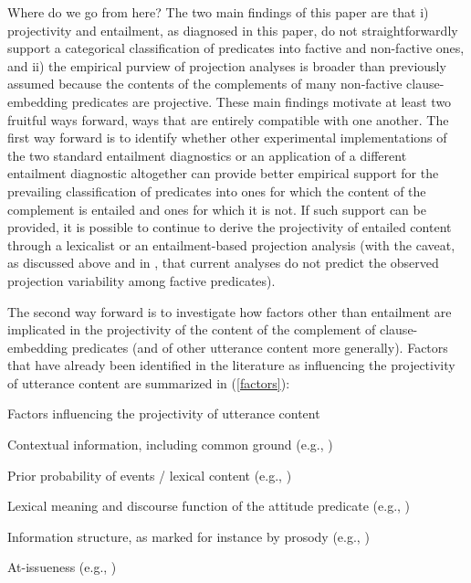 \documentclass[11pt,fleqn]{article}
\newcommand{\6}{\mbox{$[\hspace*{-.6mm}[$}}
\newcommand{\9}{\mbox{$]\hspace*{-.6mm}]$}}
\begin{document}
{Where do we go from here? The two main findings of this paper are that i) projectivity and entailment, as diagnosed in this paper, do not straightforwardly support a categorical classification of predicates into factive and non-factive ones, and ii) the empirical purview of projection analyses is broader than previously assumed because the contents of the complements of many non-factive clause-embedding predicates are projective. These main findings motivate at least two fruitful ways forward, ways that are entirely compatible with one another. The first way forward is to identify whether other experimental implementations of the two standard entailment diagnostics or an application of a different entailment diagnostic altogether can provide better empirical support for the prevailing classification of predicates into ones for which the content of the complement is entailed and ones for which it is not. If such support can be provided, it is possible to continue to derive the projectivity of entailed content through a lexicalist or an entailment-based projection analysis (with the caveat, as discussed above and in \citealt{tbd-variability}, that current analyses do not predict the observed projection variability among factive predicates). 

The second way forward is to investigate how factors other than entailment are implicated in the projectivity of the content of the complement of clause-embedding predicates (and of other utterance content more generally). Factors that have already been identified in the literature as influencing the projectivity of utterance content are summarized in (\ref{factors}): 

\begin{exe}
\ex\label{factors} Factors influencing the projectivity of utterance content
\begin{xlist}

\ex Contextual information, including common ground (e.g., \citealt{gazdar79a,gazdar79b,tonhauser-etal-eval})

\ex Prior probability of events / lexical content (e.g., \citealt{tbd-variability})

\ex Lexical meaning and discourse function of the attitude predicate (e.g., \citealt{anand-hacquard2014,tbd-variability})

\ex Information structure, as marked for instance by prosody (e.g., \citealt{cummins-rohde2015,tonhauser-salt26,djaerv-bacovcin-salt27})

\ex At-issueness (e.g., \citealt{brst-salt10,best-question,abrusan2011,tbd-variability,mahler-nels})


\end{xlist}
\end{exe}}
\end{document}
